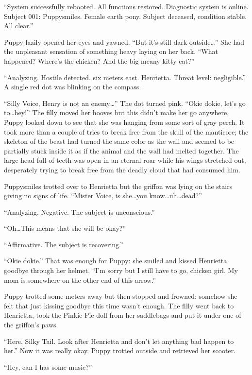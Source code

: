 ``{\mt System successfully rebooted. All functions restored. Diagnostic system is online. Subject 001: Puppysmiles. Female earth pony. Subject deceased, condition stable. All clear.}''

Puppy lazily opened her eyes and yawned. ``But it's still dark outside\dots'' She had the unpleasant sensation of something heavy laying on her back. ``What happened? Where's the chicken? And the big meany kitty cat?''

``{\mt Analyzing. Hostile detected. six meters east. Henrietta. Threat level: negligible.}'' A single red dot was blinking on the compass.

``Silly Voice, Henry is not an enemy\dots'' The dot turned pink. ``Okie dokie, let's go to\dots hey!'' The filly moved her hooves but this didn't make her go anywhere. Puppy looked down to see that she was hanging from some sort of gray perch. It took more than a couple of tries to break free from the skull of the manticore; the skeleton of the beast had turned the same color as the wall and seemed to be partially stuck inside it as if the animal and the wall had melted together. The large head full of teeth was open in an eternal roar while his wings stretched out, desperately trying to break free from the deadly cloud that had consumed him.

Puppysmiles trotted over to Henrietta but the griffon was lying on the stairs giving no signs of life. ``Mister Voice, is she\dots you know\dots uh\dots dead?''

``{\mt Analyzing. Negative. The subject is unconscious.}''

``Oh\dots This means that she will be okay?''

``{\mt Affirmative. The subject is recovering.}''

``Okie dokie.'' That was enough for Puppy: she smiled and kissed Henrietta goodbye through her helmet, ``I'm sorry but I still have to go, chicken girl. My mom is somewhere on the other end of this arrow.''

Puppy trotted some meters away but then stopped and frowned: somehow she felt that just kissing goodbye this time wasn't enough. The filly went back to Henrietta, took the Pinkie Pie doll from her saddlebags and put it under one of the griffon's paws.

``Here, Silky Tail. Look after Henrietta and don't let anything bad happen to her.'' Now it was really okay. Puppy trotted outside and retrieved her scooter.

``Hey, can I has some music?''

